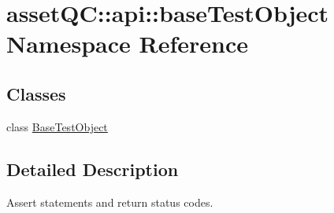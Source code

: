 \hypertarget{namespaceassetQC_1_1api_1_1baseTestObject}{\section{asset\-Q\-C\-:\-:api\-:\-:base\-Test\-Object \-Namespace \-Reference}
\label{d1/d79/namespaceassetQC_1_1api_1_1baseTestObject}
}
\subsection*{\-Classes}
\begin{DoxyCompactItemize}
\item 
class \hyperlink{classassetQC_1_1api_1_1baseTestObject_1_1BaseTestObject}{\-Base\-Test\-Object}
\end{DoxyCompactItemize}


\subsection{\-Detailed \-Description}
\begin{DoxyVerb}
Assert statements and return status codes.
\end{DoxyVerb}
 
